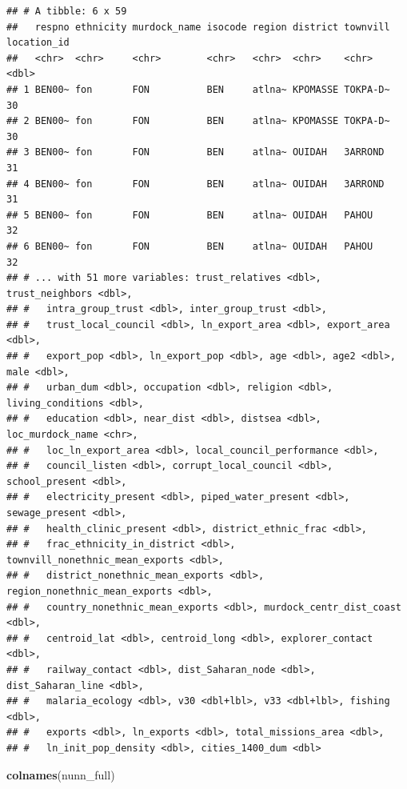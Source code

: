 \documentclass[
]{book}
\newenvironment{Shaded}{\begin{snugshade}}{\end{snugshade}}
\newcommand{\KeywordTok}[1]{\textcolor[rgb]{0.13,0.29,0.53}{\textbf{#1}}}
\newcommand{\NormalTok}[1]{#1}
\theoremstyle{definition}
\theoremstyle{definition}
\theoremstyle{definition}
\theoremstyle{definition}
\theoremstyle{remark}
\begin{document}
\begin{verbatim}
## # A tibble: 6 x 59
##   respno ethnicity murdock_name isocode region district townvill location_id
##   <chr>  <chr>     <chr>        <chr>   <chr>  <chr>    <chr>          <dbl>
## 1 BEN00~ fon       FON          BEN     atlna~ KPOMASSE TOKPA-D~          30
## 2 BEN00~ fon       FON          BEN     atlna~ KPOMASSE TOKPA-D~          30
## 3 BEN00~ fon       FON          BEN     atlna~ OUIDAH   3ARROND           31
## 4 BEN00~ fon       FON          BEN     atlna~ OUIDAH   3ARROND           31
## 5 BEN00~ fon       FON          BEN     atlna~ OUIDAH   PAHOU             32
## 6 BEN00~ fon       FON          BEN     atlna~ OUIDAH   PAHOU             32
## # ... with 51 more variables: trust_relatives <dbl>, trust_neighbors <dbl>,
## #   intra_group_trust <dbl>, inter_group_trust <dbl>,
## #   trust_local_council <dbl>, ln_export_area <dbl>, export_area <dbl>,
## #   export_pop <dbl>, ln_export_pop <dbl>, age <dbl>, age2 <dbl>, male <dbl>,
## #   urban_dum <dbl>, occupation <dbl>, religion <dbl>, living_conditions <dbl>,
## #   education <dbl>, near_dist <dbl>, distsea <dbl>, loc_murdock_name <chr>,
## #   loc_ln_export_area <dbl>, local_council_performance <dbl>,
## #   council_listen <dbl>, corrupt_local_council <dbl>, school_present <dbl>,
## #   electricity_present <dbl>, piped_water_present <dbl>, sewage_present <dbl>,
## #   health_clinic_present <dbl>, district_ethnic_frac <dbl>,
## #   frac_ethnicity_in_district <dbl>, townvill_nonethnic_mean_exports <dbl>,
## #   district_nonethnic_mean_exports <dbl>, region_nonethnic_mean_exports <dbl>,
## #   country_nonethnic_mean_exports <dbl>, murdock_centr_dist_coast <dbl>,
## #   centroid_lat <dbl>, centroid_long <dbl>, explorer_contact <dbl>,
## #   railway_contact <dbl>, dist_Saharan_node <dbl>, dist_Saharan_line <dbl>,
## #   malaria_ecology <dbl>, v30 <dbl+lbl>, v33 <dbl+lbl>, fishing <dbl>,
## #   exports <dbl>, ln_exports <dbl>, total_missions_area <dbl>,
## #   ln_init_pop_density <dbl>, cities_1400_dum <dbl>
\end{verbatim}

\begin{Shaded}
\begin{Highlighting}[]
\KeywordTok{colnames}\NormalTok{(nunn_full)}
\end{Highlighting}
\end{Shaded}
\end{document}
